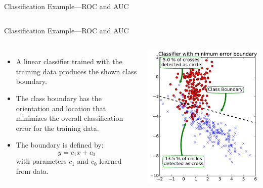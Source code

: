\documentclass[10pt, aspectratio=169]{beamer} %
\begin{document}
\begin{frame}{Classification Example---ROC and AUC}
\begin{columns}
\end{columns}
\end{frame}

\begin{frame}{Classification Example---ROC and AUC}
\begin{columns}
\begin{itemize}
\item A linear classifier trained with the training data
produces the shown class boundary.
\item The class boundary has the orientation and location 
that minimizes the overall classification error for the training data.
\item The boundary is defined by:
\[
y = c_1 x + c_0
\]
with parameters $c_1$ and $c_0$ learned from data.
\end{itemize}
\centerline{\includegraphics[width=\columnwidth]{2classBoundary.pdf}}
\end{columns}
\end{frame}
\end{document}

